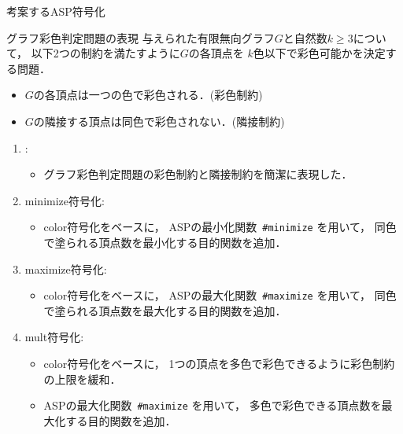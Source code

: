 \documentclass[dvipdfmx,11pt]{beamer}
\begin{document}
\begin{frame}{考案するASP符号化}
 \begin{block}{グラフ彩色判定問題の表現}
  与えられた有限無向グラフ$G$と自然数$k\geq 3$について，
  以下2つの制約を満たすように$G$の各頂点を
  $k$色以下で彩色可能かを決定する問題．
  \begin{itemize}
   \item $G$の各頂点は一つの色で彩色される．(彩色制約)
   \item $G$の隣接する頂点は同色で彩色されない．(隣接制約)
  \end{itemize}
 \end{block}
 \begin{enumerate}
   \item {}:
         \begin{itemize}
          \item グラフ彩色判定問題の彩色制約と隣接制約を簡潔に表現した．
         \end{itemize}
  \item \alert{minimize符号化}:%
        \begin{itemize}
         \item color符号化をベースに，
               ASPの最小化関数~\texttt{\#minimize} を用いて，
	       同色で塗られる頂点数を最小化する目的関数を追加．
        \end{itemize}
  \item \alert{maximize符号化}:%
        \begin{itemize}
         \item color符号化をベースに，
               ASPの最大化関数~\texttt{\#maximize} を用いて，
	       同色で塗られる頂点数を最大化する目的関数を追加．
        \end{itemize}
  \item \alert{mult符号化}:%
        \begin{itemize}
         \item color符号化をベースに，
	       1つの頂点を多色で彩色できるように彩色制約の上限を緩和．
         \item ASPの最大化関数~\texttt{\#maximize} を用いて，
	       多色で彩色できる頂点数を最大化する目的関数を追加．
        \end{itemize}
 \end{enumerate}
\end{frame}
\end{document}
